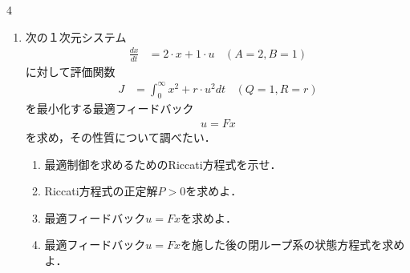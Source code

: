 \documentclass[fleqn]{article}
\begin{document}
\begin{multicols}{4}
\begin{enumerate}
\begin{enumerate}

\item 
オブザーバゲイン$K$の次元に注意してオブザーバの状態方程式を示せ．
\vspace{5cm}

\item
オブザーバの極（推定誤差の収束速さ）が$-1$, $-2$となるようにオブザーバゲイン$K$を求めよ．
\vspace{8cm}

\end{enumerate}
\vfill\null
\columnbreak




\item
次の１次元システム
\begin{align}
	\frac{dx}{dt} &= 2 \cdot x + 1 \cdot u
	\ \ \ \  (A=2, B=1) 
\nonumber
\end{align}
に対して評価関数
\begin{align}
	J &= \int_0^\infty x^2 + r \cdot u^2 dt
	\ \ \ \  (Q=1, R=r)
\nonumber
\end{align}
を最小化する最適フィードバック
\begin{align}
	u=Fx
\nonumber
\end{align}
を求め，その性質について調べたい．

\begin{enumerate}
\item 
最適制御を求めるためのRiccati方程式を示せ．
\vspace{3cm}

\item
Riccati方程式の正定解$P>0$を求めよ．
\vspace{8cm}

\item
最適フィードバック$u=Fx$を求めよ．
\vspace{4cm}

\item
最適フィードバック$u=Fx$を施した後の閉ループ系の状態方程式を求めよ．
\vspace{4cm}


\end{enumerate}
\end{enumerate}
\end{multicols}
\end{document}
